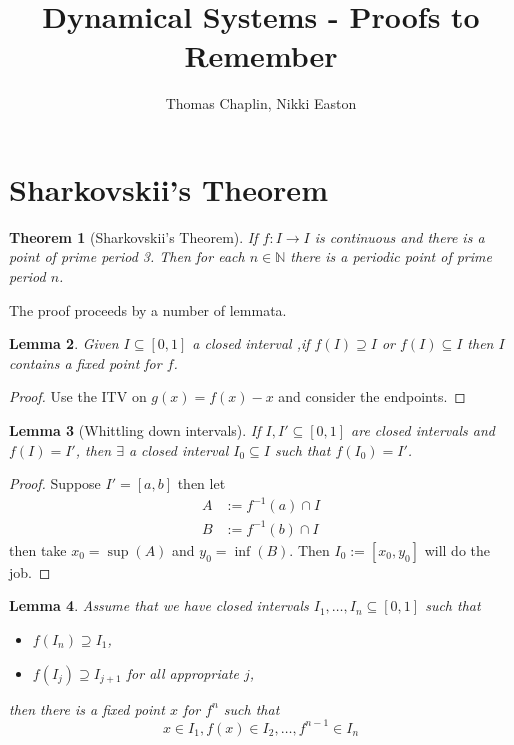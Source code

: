 \documentclass[11pt]{article}
\title{Dynamical Systems - Proofs to Remember}
\author{Thomas Chaplin, Nikki Easton}
\date{}
\newcommand{\defeq}{:=}
\newcommand{\N}{\mathbb{N}}
\newtheorem{theorem}{Theorem}[section]
\newtheorem{lemma}[theorem]{Lemma}
\begin{document}
\maketitle

\section{Sharkovskii's Theorem}
\begin{theorem}[Sharkovskii's Theorem]
\label{thrm:shark}
If $f:I \to I $ is continuous and there is a point of prime period 3.
Then for each $n\in \N$ there is a periodic point of prime period $n$.
\end{theorem}

The proof proceeds by a number of lemmata.

\begin{lemma}
Given $I\subseteq[0 ,1 ]$ a closed interval ,if $f(I) \supseteq I$ or $f(I) \subseteq I$ then $I$ contains a fixed point for $f$.
\end{lemma}

\begin{proof}
Use the ITV on $g(x)=f(x)-x$ and consider the endpoints.
\end{proof}

\begin{lemma}[Whittling down intervals]
If $I, I' \subseteq [0,1]$ are closed intervals and $f(I)=I'$, then $\exists$ a closed interval $I_0\subseteq I$ such that $f(I_0)=I'$.
\end{lemma}
\begin{proof}
Suppose $I'=[a, b]$ then let
\begin{align*}
	A & \defeq f^{-1}(a)\cap I \\
	B & \defeq f^{-1}(b)\cap I
\end{align*}
then take $x_0=\sup(A)$ and $y_0=\inf(B)$.
Then $I_0\defeq [x_0, y_0]$ will do the job.
\end{proof}

\begin{lemma}
Assume that we have closed intervals $I_1, \dots, I_n \subseteq [0, 1]$ such that
\begin{itemize}
	\item $f(I_n)\supseteq I_1$,
	\item $f(I_j)\supseteq I_{j+1}$ for all appropriate $j$,
\end{itemize}
then there is a fixed point $x$ for $f^n$ such that
\[
	x\in I_1, f(x) \in I_2, \dots , f^{n-1}\in I_n
\]
\end{lemma}
\end{document}
